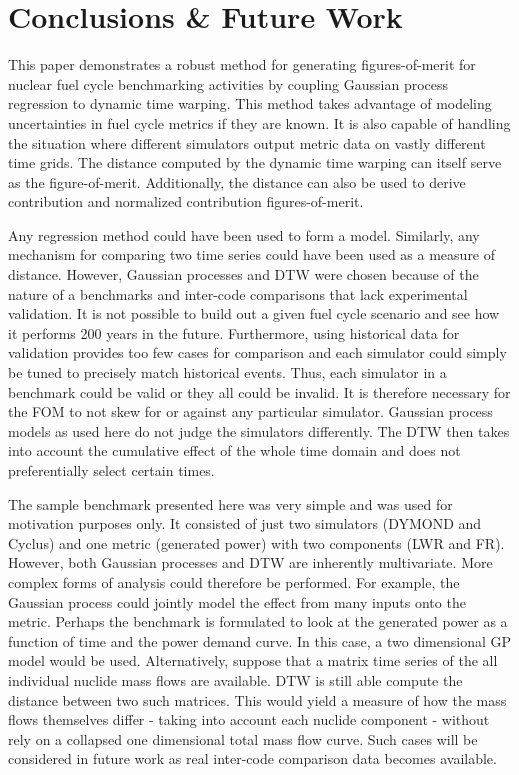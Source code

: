 \section{Conclusions \& Future Work}
\label{conclusion}

This paper demonstrates a robust method for generating figures-of-merit
for nuclear fuel cycle benchmarking activities by coupling Gaussian process
regression to dynamic time warping. This method takes advantage of modeling
uncertainties in fuel cycle metrics if they are known. It is also capable 
of handling the situation where different simulators output metric data on
vastly different time grids. The distance computed by the dynamic time 
warping can itself serve as the figure-of-merit. Additionally, the 
distance can also be used to derive contribution and normalized contribution
figures-of-merit.

Any regression method could have been used to form a model. Similarly, any
mechanism for comparing two time series could have been used as a measure
of distance.  However, Gaussian processes and DTW were chosen because of 
the nature of a benchmarks and inter-code comparisons that lack experimental
validation. It is not possible to build out a given fuel cycle scenario
and see how it performs 200 years in the future. Furthermore, using 
historical data for validation provides too few cases for comparison and 
each simulator could simply be tuned to precisely match historical events.
Thus, each simulator in a benchmark could be valid or they all could be 
invalid. It is therefore necessary for the FOM to not skew for or against 
any particular simulator. Gaussian process models as used here do not 
judge the simulators differently. The DTW then takes into account the 
cumulative effect of the whole time domain and does not preferentially 
select certain times.

The sample benchmark presented here was very simple and was used for motivation 
purposes only. It consisted of just
two simulators (DYMOND and Cyclus) and one metric (generated power) with
two components (LWR and FR).  However, both Gaussian processes and DTW
are inherently multivariate. More complex forms of analysis could therefore
be performed. For example, the Gaussian process could jointly model the 
effect from many inputs onto the metric. Perhaps the benchmark is formulated
to look at the generated power as a function of time and the power demand curve.
In this case, a two dimensional GP model would be used. Alternatively, 
suppose that a matrix time series of the all individual nuclide mass flows 
are available. DTW is still able compute the distance between two 
such matrices. This would yield a measure of how the mass flows themselves
differ - taking into account each nuclide component - without rely on a collapsed
one dimensional total mass flow curve.  Such cases will be considered in
future work as real inter-code comparison data becomes available.

